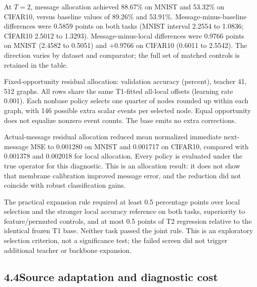 \documentclass[11pt]{article}
\begin{document}
At $T=2$, message allocation achieved 88.67\% on MNIST and 53.32\% on CIFAR10, versus baseline values of 89.26\% and 53.91\%. Message-minus-baseline differences were \textminus{}0.5859 points on both tasks (MNIST interval \textminus{}2.2554 to 1.0836; CIFAR10 \textminus{}2.5012 to 1.3293). Message-minus-local differences were \textminus{}0.9766 points on MNIST (\textminus{}2.4582 to 0.5051) and +0.9766 on CIFAR10 (\textminus{}0.6011 to 2.5542). The direction varies by dataset and comparator; the full set of matched controls is retained in the table.

\begin{table}[!htbp]
\centering
\small
\caption{Fixed-opportunity residual allocation: validation accuracy (percent), teacher 41, 512 graphs. All rows share the same T1-fitted all-local offsets (learning rate 0.001). Each nonbase policy selects one quarter of nodes rounded up within each graph, with 146 possible extra scalar events per selected node. Equal opportunity does not equalize nonzero event counts. The base emits no extra corrections.}
\label{tab:allocation}
\begin{adjustbox}{max width=\linewidth}\end{adjustbox}
\end{table}

Actual-message residual allocation reduced mean normalized immediate next-message MSE to 0.001280 on MNIST and 0.001717 on CIFAR10, compared with 0.001378 and 0.002018 for local allocation. Every policy is evaluated under the true operator for this diagnostic. This is an allocation result: it does not show that membrane calibration improved message error, and the reduction did not coincide with robust classification gains.

The practical expansion rule required at least 0.5 percentage points over local selection and the stronger local accuracy reference on both tasks, superiority to feature/permuted controls, and at most 0.5 points of T2 regression relative to the identical frozen T1 base. Neither task passed the joint rule. This is an exploratory selection criterion, not a significance test; the failed screen did not trigger additional teacher or backbone expansion.

\subsection*{4.4\quad Source adaptation and diagnostic cost}
\end{document}
